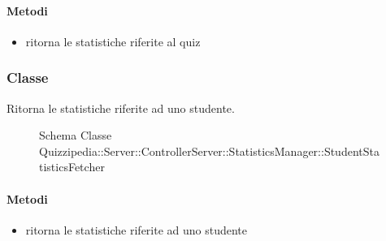 \paragraph{Metodi}
\begin{itemize}
\item {}
\newline
ritorna le statistiche riferite al quiz
\newline
\end{itemize}
\subsubsection{Classe }
Ritorna le statistiche riferite ad uno studente.
\begin{figure}[H]
\centering
\noindent{}
\caption[Schema Classe StudentStatisticsFetcher]{Schema Classe Quizzipedia::Server::ControllerServer::StatisticsManager::StudentStatisticsFetcher}
\end{figure}
\paragraph{Metodi}
\begin{itemize}
\item {}
\newline
ritorna le statistiche riferite ad uno studente
\newline
\end{itemize}
